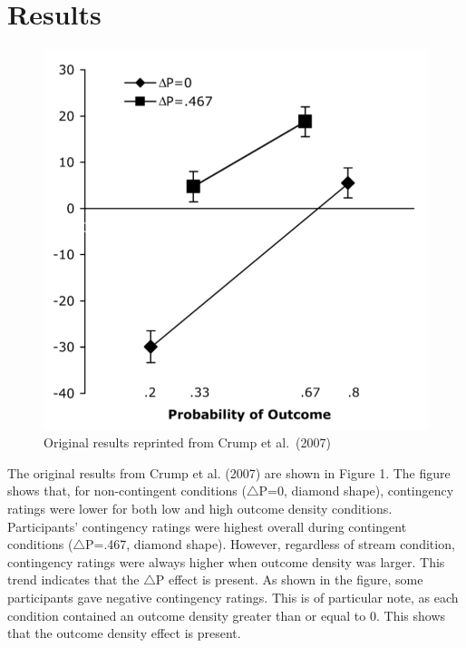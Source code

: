 \documentclass[
  english,
  man,floatsintext]{apa6}
\begin{document}
\hypertarget{results}{%
\section{Results}\label{results}}

\begin{figure}
\centering
\includegraphics{imgs/crump_results.png}
\caption{\label{fig:unnamed-chunk-2}Original results reprinted from Crump et al.~(2007)}
\end{figure}

The original results from Crump et al. (2007) are shown in Figure 1. The figure shows that, for non-contingent conditions (\(\triangle\)P=0, diamond shape), contingency ratings were lower for both low and high outcome density conditions. Participants' contingency ratings were highest overall during contingent conditions (\(\triangle\)P=.467, diamond shape). However, regardless of stream condition, contingency ratings were always higher when outcome density was larger. This trend indicates that the \(\triangle\)P effect is present. As shown in the figure, some participants gave negative contingency ratings. This is of particular note, as each condition contained an outcome density greater than or equal to 0. This shows that the outcome density effect is present.
\end{document}
